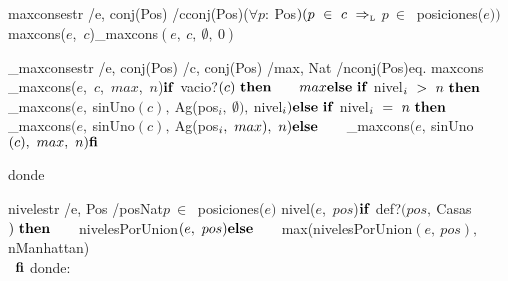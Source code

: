 \newpage

\vspace{4mm}
\tadOperacion
{maxcons}{estr /e, conj(Pos) /c}{conj(Pos)}{($\forall p:\ $Pos$)(p\ \in\ c\ \Rightarrow_{\mathrm{\scriptscriptstyle{L}}}$ $p\ \in\ $ posiciones($e))$}
\tadAxioma
{maxcons($e$,\ $c$)}{$
    $\_maxcons$(e,\ c,\ \emptyset,\ 0)
$}


\vspace{4mm}
\tadOperacion
{\_maxcons}{estr /e, conj(Pos) /c, conj(Pos) /max, Nat /n}{conj(Pos)}{eq. maxcons}          
\tadAxioma
{\_maxcons($e$,\ $c$,\ $max$,\ $n$)}{$
    \LIF\ $vacio?$(c)\ \LTHEN\ \\  
    \tab max \\
    \LELSE\ \LIF\ $nivel$_i\ >\ n\ \LTHEN\ \\ 
    \tab $\_maxcons$(e,\ $sinUno$(c),\ $Ag(pos$_i,\ \emptyset),\ $nivel$_i) \\
    \textrm{\textbf{else}}\ \textrm{\textbf{if}}\ $nivel$_i\ =\ n\ \LTHEN\ \\ 
    \tab $\_maxcons$(e,\ $sinUno$(c),\ $Ag(pos$_i,\ max),\ n) \\
    \textrm{\textbf{else}}\ \\
    \hspace*{7mm} $\_maxcons$(e,\ $sinUno$(c),\ max,\ n) \\
    \textrm{\textbf{fi}}  
$}


donde
\tadNoAlinearAxiomas
    
\vspace{4mm}
\tadOperacion
{nivel}{estr /e, Pos /pos}{Nat}{$p\ \in\ $ posiciones($e)$}%
\tadAxioma
{nivel($e$,\ $pos$)}{$
    \LIF\ $def?$(pos,\ $Casas$)\ \textrm{\textbf{then}}\ \\
    \hspace*{7mm} $nivelesPorUnion$(e,\ pos) \\
    \textrm{\textbf{else}} \\ 
    \hspace*{7mm} $max(nivelesPorUnion$(e,\ pos),\ $nManhattan)\\\
    $\textrm{\textbf{fi}}$
}
donde:
\tadNoAlinearAxiomas

